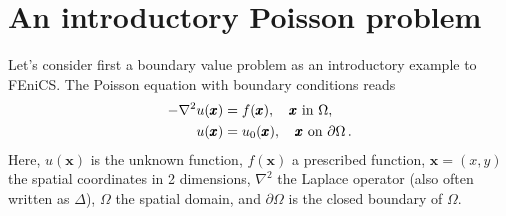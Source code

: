 \documentclass[final,3p,times,twocolumn]{elsarticle}
\newcounter{bla}
\begin{document}
\section{An introductory Poisson problem}
Let's consider first a boundary value problem as an introductory example to FEniCS. The Poisson equation with boundary conditions reads
\begin{align}
   - \nabla^2 u(\pmb{x}) &= f(\pmb{x}),\quad \pmb{x}\mbox{ in } \Omega, \label{eq:PoissonPDE}
        \\
    u(\pmb{x}) &= u_0(\pmb{x}),\quad \pmb{x}\mbox{ on } \partial \Omega\thinspace . \notag
\end{align}
Here, $u(\pmb{x})$ is the unknown function, $f(\pmb{x})$ a
prescribed function, $\pmb{x}=(x, y)$ the spatial coordinates in 2 dimensions, $\nabla^2$ the Laplace operator (also
often written as $\Delta$), $\Omega$ the spatial domain, and
$\partial\Omega$ is the closed boundary of $\Omega$.
\end{document}
